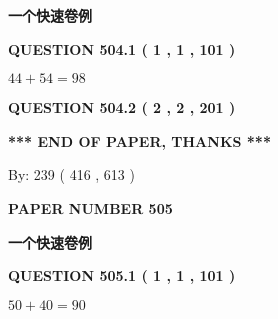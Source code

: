\documentclass{ctexart}
\begin{document}
   
   
   
 \vspace{0.2in}
{\LARGE {\textbf{ 一个快速卷例}}}
   
   
  
\vspace{0.2in}
  
{\textbf{\Large{QUESTION
504.1 
 ( 1 , 1 , 101 )
}}}
  
  
 
 

$ %
44 +  %
54=   %
98$
 
 
  
\vspace{0.2in}
  
{\textbf{\Large{QUESTION
504.2 
 ( 2 , 2 , 201 )
}}}
  
  
   
   
 \vspace{0.2in}
 
   
   
   
   
\vspace{1.0in} 
{\textbf{\large{ *** END OF PAPER, THANKS *** }}} 
   
   
\hspace{1.0in} By: 
 239 ( 416 ,  613 )
   
   
   
   
\newpage 
\setcounter{page}{ 
   505001 } 
   
   
   
   
 {\textbf{ \Large{ PAPER NUMBER  505  }}}
   
   
\vspace{0.2in}
   
   
   
   
   
   
 \vspace{0.2in}
{\LARGE {\textbf{ 一个快速卷例}}}
   
   
  
\vspace{0.2in}
  
{\textbf{\Large{QUESTION
505.1 
 ( 1 , 1 , 101 )
}}}
  
  
 
 

$ %
50 +  %
40=   %
90$
 
 
  
\vspace{0.2in}
  
\end{document}
